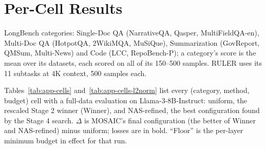 \clearpage
\appendix

\section{Per-Cell Results}
\label{app:cells}

LongBench categories: Single-Doc QA (NarrativeQA, Qasper, MultiFieldQA-en), Multi-Doc QA (HotpotQA, 2WikiMQA, MuSiQue), Summarization (GovReport, QMSum, Multi-News) and Code (LCC, RepoBench-P); a category's score is the mean over its datasets, each scored on all of its 150--500 samples. RULER uses its 11 subtasks at 4K context, 500 samples each.

Tables~\ref{tab:app-cells} and~\ref{tab:app-cells-l2norm} list every (category, method, budget) cell with a full-data evaluation on Llama-3-8B-Instruct: uniform, the rescaled Stage 2 winner (Winner), and NAS-refined, the best configuration found by the Stage 4 search. $\Delta$ is MOSAIC's final configuration (the better of Winner and NAS-refined) minus uniform; losses are in bold. ``Floor'' is the per-layer minimum budget in effect for that run.

